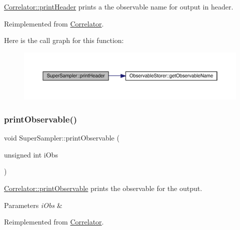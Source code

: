 \mbox{\hyperlink{class_correlator_ac7c5a07d7cbee97c417a1659b93083b2}{Correlator\+::print\+Header}} prints a the observable name for output in header. 



Reimplemented from \mbox{\hyperlink{class_correlator_ac7c5a07d7cbee97c417a1659b93083b2}{Correlator}}.

Here is the call graph for this function\+:\nopagebreak
\begin{figure}[H]
\begin{center}
\leavevmode
\includegraphics[width=350pt]{class_super_sampler_a9bedfcc40a22c48378a6ed63f64e6957_cgraph}
\end{center}
\end{figure}
\mbox{\label{class_super_sampler_adf92b9281ee9a782e6c00424dd23451d}} 
\subsubsection{\texorpdfstring{printObservable()}{printObservable()}}
{\footnotesize\ttfamily void Super\+Sampler\+::print\+Observable (\begin{DoxyParamCaption}\item[{unsigned int}]{i\+Obs }\end{DoxyParamCaption})\hspace{0.3cm}{\ttfamily [virtual]}}



\mbox{\hyperlink{class_correlator_a15744ddb9f2b71fff34ac762d101df38}{Correlator\+::print\+Observable}} prints the observable for the output. 


\begin{DoxyParams}{Parameters}
{\em i\+Obs} & \\
\hline
\end{DoxyParams}


Reimplemented from \mbox{\hyperlink{class_correlator_a15744ddb9f2b71fff34ac762d101df38}{Correlator}}.

